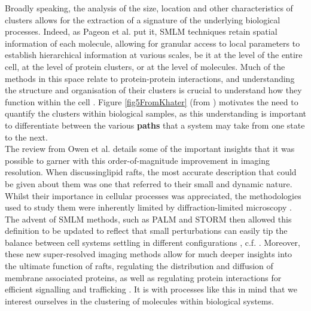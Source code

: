 \documentclass[11pt]{article}
\begin{document}
Broadly speaking, the analysis of the size, location and other characteristics of clusters allows for the extraction of a signature of the underlying biological processes. Indeed, as Pageon et al. \cite{clusterDetection} put it, SMLM techniques retain spatial information of each molecule, allowing for granular access to local parameters to establish hierarchical information at various scales, be it at the level of the entire cell, at the level of protein clusters, or at the level of molecules\cite{clusterDetection}. Much of the methods in this space relate to protein-protein interactions, and understanding the structure and organisation of their clusters is crucial to understand how they function within the cell \cite{Khater2020}. Figure \ref{fig5FromKhater} (from \cite{Khater2020}) motivates the need to quantify the clusters within biological samples, as this understanding is important to differentiate between the various \textbf{paths} that a system may take from one state to the next.\\




The review from Owen et al. \cite{lipidRaftHypothesis} details some of the important insights that it was possible to garner with this order-of-magnitude improvement in imaging resolution. When discussinglipid rafts, the most accurate description that could be given about them was one that referred to their small and dynamic nature. Whilst their importance in cellular processes was appreciated, the methodologies used to study them were inherently limited by diffraction-limited microscopy \cite{lipidRaftHypothesis}. The advent of SMLM methods, such as PALM \cite{shroff2013photoactivated} and STORM \cite{rust2006sub} then allowed this definition to be updated to reflect that small perturbations can easily tip the balance between cell systems settling in different configurations \cite{lipidRaftHypothesis}, c.f. \cite{25FromLipidRaft}. Moreover, these new super-resolved imaging methods allow for much deeper insights into the ultimate function of rafts, regulating the distribution and diffusion of membrane associated proteins, as well as regulating protein interactions for efficient signalling and trafficking \cite{lipidRaftHypothesis}. It is with processes like this in mind that we interest ourselves in the clustering of molecules within biological systems.\\
\end{document}
